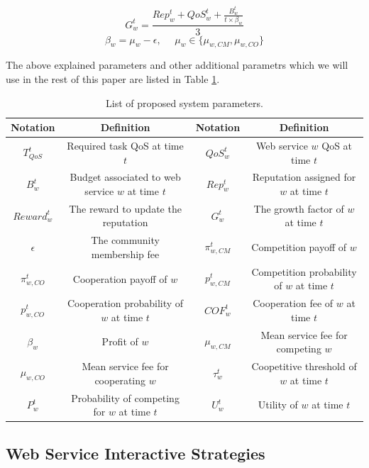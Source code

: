 \documentclass[fleqn]{singlecol-new}
\begin{document}
\begin{equation}\label{eq:growthfactor}
G^t_w = \frac{Rep^t_w + QoS_w^t+\frac{B_w^t}{t\times \beta_w}}{3}
\end{equation}
\begin{equation*}
\beta_w=\mu_{w}-\epsilon, ~~~~~~\mu_{w} \in\{\mu_{w, CM}, \mu_{w,
CO}\}
\end{equation*}

The above explained parameters and other additional parametrs
which we will use in the rest of this paper are listed in Table
\ref{Preliminaries}.


\begin{table}
\centering
\caption{List of proposed system parameters.}
\begin{tabular}{|c|c||c|c|}
\hline
\textbf{Notation} & \textbf{Definition} & \textbf{Notation} & \textbf{Definition}\\
\hline\hline
$T_{QoS}^t$ & Required task QoS at time $t$ & $QoS_w^t$ & Web service $w$ QoS at time $t$ \\
$B_w^t$ & Budget associated to web service $w$ at time $t$ & $Rep^t_w$ & Reputation assigned for $w$ at time $t$\\
$Reward_w^t$ & The reward to update the reputation & $G^t_w$ & The growth factor of $w$ at time $t$\\
$\epsilon$ & The community membership fee & $\pi_{w,CM}^t$ & Competition payoff of $w$ \\
$\pi_{w,CO}^t$ & Cooperation payoff of $w$ & $p_{w,CM}^t$ & Competition probability of $w$ at time $t$\\
$p_{w,CO}^t$ & Cooperation probability of $w$ at time $t$& $COF_w^t$ & Cooperation fee of $w$ at time $t$\\
$\beta_w$ & Profit of $w$& $\mu_{w, CM}$ & Mean service fee for competing $w$ \\
$\mu_{w, CO}$ & Mean service fee for cooperating $w$ & $\tau_w^t$ & Coopetitive threshold of $w$ at time $t$ \\
$P_w^t$ & Probability of competing for $w$ at time $t$& $U_w^t$ & Utility of $w$ at time $t$\\
\hline
\end{tabular}
\label{Preliminaries}
\end{table}

\subsection{Web Service Interactive Strategies}
\end{document}
